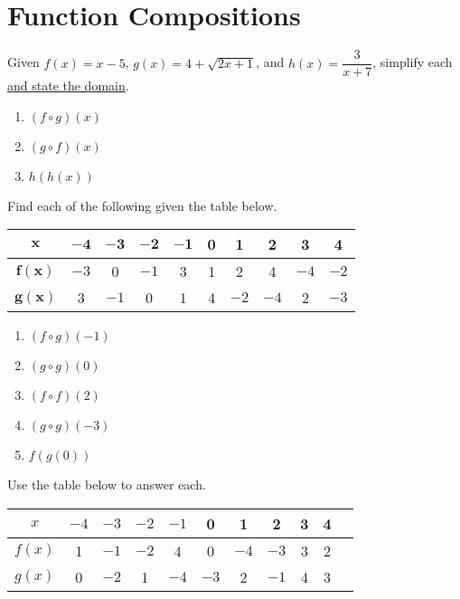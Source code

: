 \chapter{Function Compositions}

Given $f(x) = x - 5$, $g(x) = 4 + \sqrt{2x+1}$, and $h(x) = \dfrac{3}{x+7}$, simplify each \underline{and state the domain}.
\begin{enumerate}
	\item $(f \circ g)(x)$
	\item $(g \circ f)(x)$
	\item $h(h(x))$
\setcounter{Review}{\value{enumi}}
\end{enumerate}

Find each of the following given the table below.
\begin{center}
\begin{tabular}{c|c|c|c|c|c|c|c|c|c}
    $\bm{x}$ & $\bm{-4}$ & $\bm{-3}$ & $\bm{-2}$ & $\bm{-1}$ & \textbf{0} & \textbf{1} & \textbf{2} & \textbf{3} & \textbf{4} \\ \hline
    $\bm{f(x)}$ & $-3$ & 0 & $-1$ & 3 & 1 & 2 & 4 & $-4$ & $-2$ \\ \hline
    $\bm{g(x)}$ & 3 & $-1$ & 0 & 1 & 4 & $-2$ & $-4$ & 2 & $-3$ \\
\end{tabular}
\end{center}

\begin{multicols}{5}
\begin{enumerate}	\setcounter{enumi}{\value{Review}}
\item $(f \circ g)(-1)$
\item $(g \circ g)(0)$
\item $(f \circ f)(2)$
\item $(g \circ g)(-3)$
\item $f(g(0))$
\setcounter{Review}{\value{enumi}}
\end{enumerate}
\end{multicols}

Use the table below to answer each.
\begin{center}
    \begin{tabular}{|c|c|c|c|c|c|c|c|c|c|c|}
    \hline 
        $x$ & $-4$ & $-3$ & $-2$ & $-1$ & 0 & 1 & 2 & 3 & 4 \\ \hline 
        $f(x)$ & 1 & $-1$ & $-2$ & 4 & 0 & $-4$ & $-3$ & 3 & 2 \\ \hline 
        $g(x)$ & 0 & $-2$ & 1 & $-4$ & $-3$ & 2 & $-1$ & 4 & 3 \\ \hline 
    \end{tabular}
\end{center}

